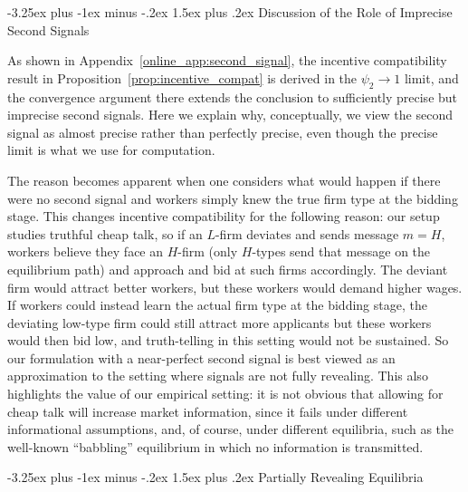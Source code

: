 \documentclass[12pt]{article}
\makeatletter
\renewcommand{\subsection}{%
  \@startsection{subsection}{2}{\z@}%
  {-3.25ex plus -1ex minus -.2ex}%
  {1.5ex plus .2ex}%
  {\normalfont\large\bfseries}%
}
\makeatother
\begin{document}
\subsection{Discussion of the Role of Imprecise Second Signals}
\label{online_app:imprecise_second_signal}

As shown in Appendix~\ref{online_app:second_signal}, the incentive compatibility result in Proposition~\ref{prop:incentive_compat} is derived in the $\psi_{2}\to 1$ limit, and the convergence argument there extends the conclusion to sufficiently precise but imprecise second signals. Here we explain why, conceptually, we view the second signal as almost precise rather than perfectly precise, even though the precise limit is what we use for computation.

The reason becomes apparent when one considers what would happen if there were no second signal and workers simply knew the true firm type at the bidding stage. This changes incentive compatibility for the following reason: our setup studies truthful cheap talk, so if an $L$-firm deviates and sends message $m=H$, workers believe they face an $H$-firm (only $H$-types send that message on the equilibrium path) and approach and bid at such firms accordingly. The deviant firm would attract better workers, but these workers would demand higher wages. If workers could instead learn the actual firm type at the bidding stage, the deviating low-type firm could still attract more applicants but these workers would then bid low, and truth-telling in this setting would not be sustained. So our formulation with a near-perfect second signal is best viewed as an approximation to the setting where signals are not fully revealing. This also highlights the value of our empirical setting: it is not obvious that allowing for cheap talk will increase market information, since it fails under different informational assumptions, and, of course, under different equilibria, such as the well-known ``babbling'' equilibrium in which no information is transmitted.





\subsection{Partially Revealing Equilibria}
\label{online_app:partially_revealing_eq}
\end{document}
